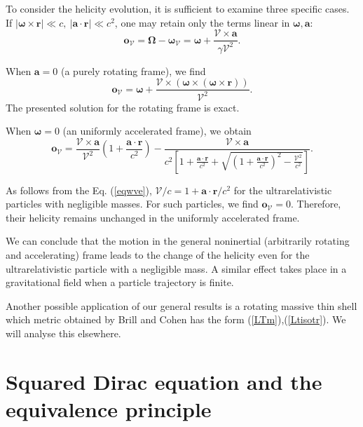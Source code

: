 \documentclass[preprint,showpacs,preprintnumbers,eqsecnum,amsmath,amssymb]{revtex4}
\begin{document}
To consider the helicity evolution, it is sufficient to examine
three specific cases. If $|\bm\omega\times\bm r|\ll c,~|\bm
a\cdot\bm r|\ll c^2$, one may retain only the terms linear in
$\bm\omega,\bm a$:
\begin{equation}
\bm o_{\mathcal{V}} =\bm\Omega-\bm\omega_{\mathcal{V}}= \bm\omega+
\frac{\bm{\mathcal{V}}\times\bm a}{\gamma{\mathcal{V}}^2}.\label{Hamlwfa}
\end{equation}

When $\bm a=0$ (a purely rotating frame), we find
\begin{equation}
\bm o_{\mathcal{V}} =\bm\omega+ \frac{\bm{\mathcal{V}}\times(\bm\omega\times
(\bm\omega\times\bm r))}{{\mathcal{V}}^2}.\label{Hamlwna}
\end{equation}
The presented solution for the rotating frame is exact.

When $\bm\omega=0$ (an uniformly accelerated frame), we obtain
\begin{equation}
\bm o_{\mathcal{V}} = \frac{\bm{\mathcal{V}}\times\bm
a}{\mathcal{V}^2} \left(1+\frac{\bm a\cdot\bm r} {c^2}\right)-
\frac{\bm{\mathcal{V}}\times\bm a}{c^2 \left[1+\frac{\bm a\cdot\bm
r} {c^2}+\sqrt{\left(1+\frac{\bm a\cdot\bm r}{c^2}\right)^2-
\frac{\mathcal{V}^2}{c^2}}\right]}.\label{Hamluaf}
\end{equation}

As follows from the Eq. (\ref{eqwve}), $\mathcal{V}/c=1+\bm
a\cdot\bm r/c^2$ for the ultrarelativistic particles with
negligible masses. For such particles, we find $\bm o_{\mathcal{V}} =0$.
Therefore, their helicity remains unchanged in the uniformly
accelerated frame.

We can conclude that the motion in the general noninertial
(arbitrarily rotating and accelerating) frame leads to the change
of the helicity even for the ultrarelativistic particle with a
negligible mass. A similar effect takes place in a gravitational
field when a particle trajectory is finite.

Another possible application of our general results is a rotating
massive thin shell which metric obtained by Brill and Cohen
\cite{BC} has the form (\ref{LTm}),(\ref{Ltisotr}). We will
analyse this elsewhere.


\section{Squared Dirac equation and the equivalence principle}\label{squar}
\end{document}
